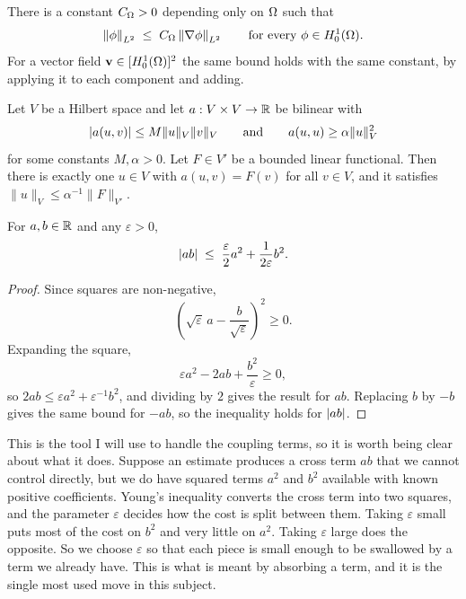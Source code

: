 \documentclass[11pt,a4paper]{article}
\begin{document}
\begin{lemma}\label{lem:poincare}
There is a constant $C_\Omega > 0$ depending only on $\Omega$ such that
\[
  \left\lVert \phi \right\rVert_{L^{2}} \;\le\; C_\Omega \left\lVert \nabla \phi \right\rVert_{L^{2}}
  \qquad \text{for every } \phi \in H^{1}_{0}(\Omega) .
\]
For a vector field $\mathbf{v} \in [H^{1}_{0}(\Omega)]^{2}$ the same bound holds with the same
constant, by applying it to each component and adding.
\end{lemma}

\begin{lemma}\label{lem:laxmilgram}
Let $V$ be a Hilbert space and let $a : V \times V \to \mathbb{R}$ be bilinear with
\[
  \left\lvert a(u,v) \right\rvert \le M \lVert u \rVert_{V} \lVert v \rVert_{V}
  \qquad \text{and} \qquad
  a(u,u) \ge \alpha \lVert u \rVert_{V}^{2}
\]
for some constants $M, \alpha > 0$. Let $F \in V'$ be a bounded linear
functional. Then there is exactly one $u \in V$ with $a(u,v) = F(v)$ for all
$v \in V$, and it satisfies $\lVert u \rVert_{V} \le \alpha^{-1} \lVert F
\rVert_{V'}$.
\end{lemma}

\begin{lemma}\label{lem:young}
For $a, b \in \mathbb{R}$ and any $\varepsilon > 0$,
\[
  \left\lvert ab \right\rvert \;\le\; \frac{\varepsilon}{2} a^{2} + \frac{1}{2\varepsilon} b^{2}.
\]
\end{lemma}

\begin{proof}
Since squares are non-negative,
\[
  \left( \sqrt{\varepsilon}\, a - \frac{b}{\sqrt{\varepsilon}} \right)^{2} \ge 0 .
\]
Expanding the square,
\[
  \varepsilon a^{2} - 2ab + \frac{b^{2}}{\varepsilon} \ge 0 ,
\]
so $2ab \le \varepsilon a^{2} + \varepsilon^{-1} b^{2}$, and dividing by $2$
gives the result for $ab$. Replacing $b$ by $-b$ gives the same bound for
$-ab$, so the inequality holds for $\left\lvert ab \right\rvert$.
\end{proof}

\begin{remark}\label{rem:whyeps}
This is the tool I will use to handle the coupling terms, so it is worth being
clear about what it does. Suppose an estimate produces a cross term $ab$ that we
cannot control directly, but we do have squared terms $a^{2}$ and $b^{2}$
available with known positive coefficients. Young's inequality converts the
cross term into two squares, and the parameter $\varepsilon$ decides how the
cost is split between them. Taking $\varepsilon$ small puts most of the cost on
$b^{2}$ and very little on $a^{2}$. Taking $\varepsilon$ large does the
opposite. So we choose $\varepsilon$ so that each piece is small enough to be
swallowed by a term we already have. This is what is meant by absorbing a term,
and it is the single most used move in this subject.
\end{remark}
\end{document}
